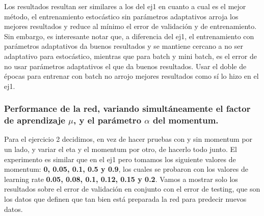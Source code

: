 Los resultados resultan ser similares a los del ej1 en cuanto a cual es el mejor método, el entrenamiento estocástico sin parámetros adaptativos arroja 
los mejores resultados y reduce al mínimo el error de validación y de entrenamiento. Sin embargo, es interesante notar que, a diferencia del ej1, el 
entrenamiento con parámetros adaptativos da buenos resultados y se mantiene cercano a no ser adaptativo para estocástico, mientras que para batch y 
mini batch, es el error de no usar parámetros adaptativos el que da buenos resultados. Usar el doble de épocas para entrenar con batch no arrojo 
mejores resultados como sí lo hizo en el ej1.

\subsubsection{Performance de la red, variando simultáneamente el factor de aprendizaje $\mu$, y el parámetro $\alpha$ del momentum.}

Para el ejercicio 2 decidimos, en vez de hacer pruebas con y sin momentum por un lado, y variar el eta y el momentum por otro, de hacerlo todo junto.
El experimento es similar que en el ej1 pero tomamos los siguiente valores de momentum: \textbf{0, 0.05, 0.1, 0.5 y 0.9}, los cuales se 
probaron con los valores de learning rate \textbf{0.05, 0.08, 0.1, 0.12, 0.15 y 0.2}. Vamos a mostrar solo los resultados sobre el error de validación 
en conjunto con el error de testing, que son los datos que definen que tan bien está preparada la red para predecir nuevos datos.

